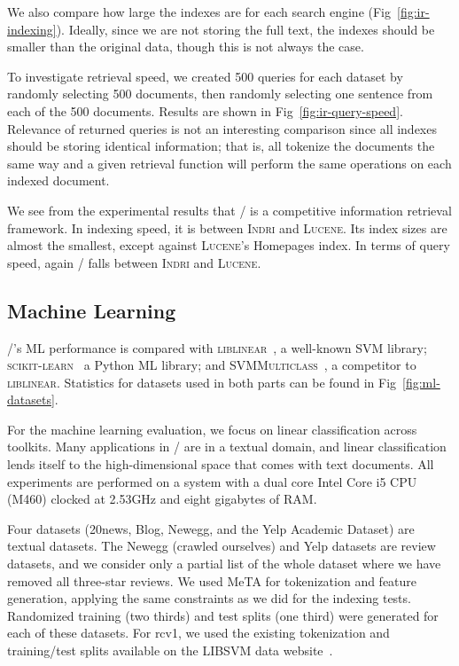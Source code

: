 We also compare how large the indexes are for each search engine
(Fig~\ref{fig:ir-indexing}). Ideally, since we are not storing the full text,
the indexes should be smaller than the original data, though this is not always
the case.

To investigate retrieval speed, we created 500 queries for each dataset by
randomly selecting 500 documents, then randomly selecting one sentence from each
of the 500 documents. Results are shown in Fig~\ref{fig:ir-query-speed}.
Relevance of returned queries is not an interesting comparison since all indexes
should be storing identical information; that is, all tokenize the documents the
same way and a given retrieval function will perform the same operations on each
indexed document.

We see from the experimental results that \meta/ is a competitive information
retrieval framework. In indexing speed, it is between \textsc{Indri} and
\textsc{Lucene}. Its index sizes are almost the smallest, except against
\textsc{Lucene}'s Homepages index. In terms of query speed, again \meta/ falls
between \textsc{Indri} and \textsc{Lucene}.







\subsection{Machine Learning}

\meta/'s ML performance is compared with \textsc{liblinear}~\cite{liblinear}, a
well-known SVM library; \textsc{scikit-learn}~\cite{scikit} a Python ML library;
and \textsc{SVMMulticlass}~\cite{svmmulticlass}, a competitor to
\textsc{liblinear}. Statistics for datasets used in both parts can be found in
Fig~\ref{fig:ml-datasets}.

For the machine learning evaluation, we focus on linear classification across
toolkits. Many applications in \meta/ are in a textual domain, and linear
classification lends itself to the high-dimensional space that comes with text
documents. All experiments are performed on a system with a dual core Intel Core
i5 CPU (M460) clocked at 2.53GHz and eight gigabytes of RAM.

Four datasets (20news, Blog, Newegg, and the Yelp Academic
Dataset\footnotemark[10]) are textual datasets. The Newegg (crawled ourselves)
and Yelp datasets are review datasets, and we consider only a partial list of
the whole dataset where we have removed all three-star reviews. We used MeTA for
tokenization and feature generation, applying the same constraints as we did for
the indexing tests. Randomized training (two thirds) and test splits (one third)
were generated for each of these datasets. For rcv1, we used the existing
tokenization and training/test splits available on the LIBSVM data
website~\footnotemark[11].

